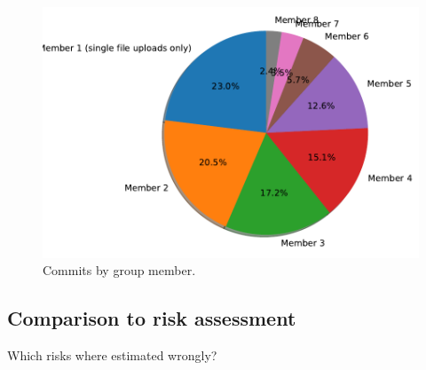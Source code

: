 \begin{figure}[h!]
	\centering
\includegraphics[width=0.7\linewidth]{group_work/name_commits}
\caption{Commits by group member.}
\end{figure}

\subsection*{Comparison to risk assessment}

Which risks where estimated wrongly?

